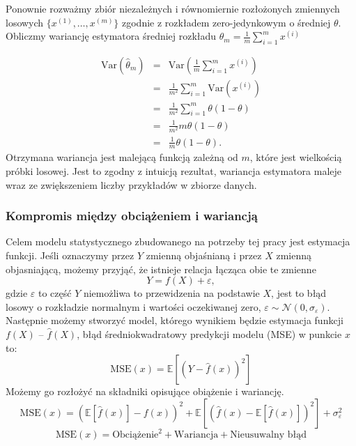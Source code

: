 \documentclass[11pt]{book}
\theoremstyle{definition}
\begin{document}
\noindent Ponownie rozważmy zbiór niezależnych i równomiernie rozłożonych zmiennych losowych $\{{ x^{(1)}, \dots, x^{(m)} }\}$ zgodnie z rozkładem zero-jedynkowym o średniej $\theta$. Obliczmy wariancję estymatora średniej rozkładu $\theta_m = \frac{1}{m} \sum_{i=1}^m x^{(i)}$


\begin{eqnarray}
\text{Var}\left(\hat{\theta}_m\right) &=& \text{Var}\left( \frac{1}{m} \sum_{i=1}^m x^{(i)} \right) \nonumber \\
&=& \frac{1}{m^2} \sum_{i=1}^m   \text{Var} \left( x^{(i)} \right) \nonumber \\
&=& \frac{1}{m^2} \sum_{i=1}^m   \theta \left( 1-\theta \right) \nonumber \\
&=& \frac{1}{m^2} m \theta \left( 1-\theta \right) \nonumber \\
&=& \frac{1}{m} \theta \left( 1-\theta \right).
\end{eqnarray}
%
Otrzymana wariancja jest malejącą funkcją zależną od $m$, które jest wielkością próbki losowej. Jest to zgodny z intuicją rezultat, wariancja estymatora maleje wraz ze zwiększeniem liczby przykładów w zbiorze danych.

\subsubsection{Kompromis między obciążeniem i wariancją}

Celem modelu statystycznego zbudowanego na potrzeby tej pracy jest estymacja funkcji. Jeśli oznaczymy przez $Y$ zmienną objaśnianą i przez $X$ zmienną objasniającą, możemy przyjąć, że istnieje relacja łącząca obie te zmienne
%
\begin{equation}
 Y = f(X) + \varepsilon,
\end{equation}
%
gdzie $\varepsilon$ to część $Y$ niemożliwa to przewidzenia na podstawie $X$, jest to błąd losowy o rozkładzie normalnym i wartości oczekiwanej zero,  $\varepsilon \sim \mathcal{N}(0, \sigma_{\varepsilon})$. Następnie możemy stworzyć model, którego wynikiem będzie estymacja funkcji $f(X)$ -- $\hat{f}(X)$, błąd średniokwadratowy predykcji modelu (MSE) w punkcie $x$ to:
%
\begin{equation}
\text{MSE}(x) = \mathbb{E} \left[ \left(Y - \hat{f}(x)\right)^2  \right] 
\end{equation}
%
Możemy go rozłożyć na składniki opisujące obiążenie i wariancję.
%
\begin{equation}
\text{MSE}(x) =  \left(  \mathbb{E}\left[\hat{f}(x)\right] - f(x) \right)^2 +  \mathbb{E} \left[ \left(\hat{f}(x) - \mathbb{E}\left[ \hat{f}(x)\right]\right)^2  \right]  + \sigma^2_{\varepsilon}
\end{equation}
%
$$
\text{MSE}(x) = \text{Obciążenie}^2 + \text{Wariancja} + \text{Nieusuwalny błąd}
$$
\end{document}
